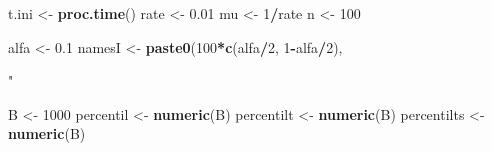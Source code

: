 \documentclass[]{book}
\newenvironment{Shaded}{\begin{snugshade}}{\end{snugshade}}
\newcommand{\KeywordTok}[1]{\textcolor[rgb]{0.13,0.29,0.53}{\textbf{#1}}}
\newcommand{\DecValTok}[1]{\textcolor[rgb]{0.00,0.00,0.81}{#1}}
\newcommand{\FloatTok}[1]{\textcolor[rgb]{0.00,0.00,0.81}{#1}}
\newcommand{\StringTok}[1]{\textcolor[rgb]{0.31,0.60,0.02}{#1}}
\newcommand{\OperatorTok}[1]{\textcolor[rgb]{0.81,0.36,0.00}{\textbf{#1}}}
\newcommand{\NormalTok}[1]{#1}
\theoremstyle{definition}
\theoremstyle{definition}
\theoremstyle{definition}
\theoremstyle{remark}
\begin{document}
\begin{Shaded}
\begin{Highlighting}[]
\NormalTok{t.ini <-}\StringTok{ }\KeywordTok{proc.time}\NormalTok{()}
\NormalTok{rate <-}\StringTok{ }\FloatTok{0.01}
\NormalTok{mu <-}\StringTok{ }\DecValTok{1}\OperatorTok{/}\NormalTok{rate}
\NormalTok{n <-}\StringTok{ }\DecValTok{100}

\NormalTok{alfa <-}\StringTok{ }\FloatTok{0.1}
\NormalTok{namesI <-}\StringTok{ }\KeywordTok{paste0}\NormalTok{(}\DecValTok{100}\OperatorTok{*}\KeywordTok{c}\NormalTok{(alfa}\OperatorTok{/}\DecValTok{2}\NormalTok{, }\DecValTok{1}\OperatorTok{-}\NormalTok{alfa}\OperatorTok{/}\DecValTok{2}\NormalTok{), }\StringTok{"%

\NormalTok{B <-}\StringTok{ }\DecValTok{1000}
\NormalTok{percentil <-}\StringTok{ }\KeywordTok{numeric}\NormalTok{(B)}
\NormalTok{percentilt <-}\StringTok{ }\KeywordTok{numeric}\NormalTok{(B)}
\NormalTok{percentilts <-}\StringTok{ }\KeywordTok{numeric}\NormalTok{(B)}

}
\end{Highlighting}
\end{Shaded}
\end{document}
